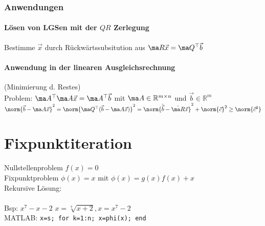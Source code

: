 \documentclass[fs, footer]{latex4ei}
\begin{document}
\begin{sectionbox}
\begin{sectionbox}
\begin{sectionbox}
	\subsubsection*{Anwendungen}
	\paragraph{Lösen von LGSen mit der $Q R$ Zerlegung}
	Bestimme $\vec x$ durch Rückwärtssubsitution aus $\ma R \vec x = \ma Q^\top \vec b$
	\paragraph{Anwendung in der linearen Ausgleichsrechnung}
	(Minimierung d. Restes)\\
	Problem: $\ma A^\top \ma A \vec x = \ma A^\top \vec b$ mit $\ma A \in \mathbb R^{m \times n }$ und $\vec b \in \mathbb R^{m}$ \\ 
	$\norm{\vec b - \ma A \vec x}^2 = \norm{\ma Q^\top (\vec b - \ma A \vec x)}^2 = \norm{\tilde{\vec b} - \tilde{\ma R} \vec x}^2 + \norm{\vec c}^2 \ge \norm{\vec c^2}$
\end{sectionbox}
\section{Fixpunktiteration}

\begin{sectionbox}
	Nullstellenproblem $f(x) = 0$\\
	Fixpunktproblem $\phi(x) = x$ \qquad mit $\phi(x) = g(x)f(x) + x$\\  %
	Rekursive Lösung: \\
	\\
	Bsp: $x^7 - x -2$ \quad $x = \sqrt[7]{x+2}, x= x^7 -2$\\ 
	MATLAB: \texttt{x=s; for k=1:n; x=phi(x); end}
	

\end{sectionbox}
\end{sectionbox}
\end{sectionbox}
\end{document}
